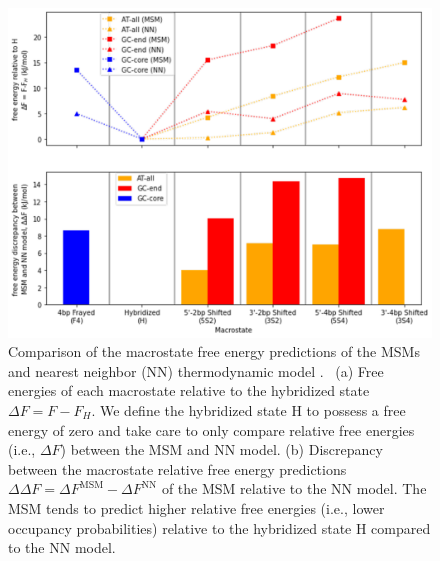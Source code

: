 \documentclass[journal=jpcbfk,manuscript=article]{achemso}
\newcommand*{\rood}[1]{{\color{red}{#1}}}
\begin{document}
\begin{figure}[ht!]
	\begin{center} 
        \includegraphics[width=160mm, scale=1]{Fig3.pdf}
        \caption{Comparison of the macrostate free energy predictions of the MSMs and nearest neighbor (NN) thermodynamic model \rood{at the sequence melting temperatures}.~\citep{SantaLucia1998AThermodynamics, Santalucia2004TheMotifs} (a) Free energies of each macrostate relative to the hybridized state $\Delta F = F - F_H$. We define the hybridized state H to possess a free energy of zero and take care to only compare relative free energies (i.e., $\Delta F$) between the MSM and NN model. (b) Discrepancy between the macrostate relative free energy predictions $\Delta \Delta F = \Delta F^\mathrm{MSM} - \Delta F^\mathrm{NN}$ of the MSM relative to the NN model. The MSM tends to predict higher relative free energies (i.e., lower occupancy probabilities) relative to the hybridized state H compared to the NN model.}
        \label{fig:NN_table}
	\end{center}
\end{figure}
\end{document}
